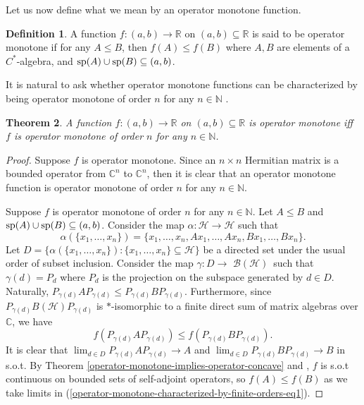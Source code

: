 \documentclass[12pt,a4paper]{amsart}
\newtheorem{theorem}{Theorem}
\theoremstyle{definition}
\newtheorem{definition}[theorem]{Definition}
\newcommand{\mybh}{$\mathscr{B}(\mathscr{H})$}
\begin{document}
	Let us now define what we mean by an operator monotone function.
	\begin{definition}
		 A function $f: (a, b) \rightarrow \mathbb{R}$ on $(a, b) \subseteq \mathbb{R}$ is said to be operator monotone if for any $A \leq B$, then $f(A) \leq f(B)$ 	where $A, B$ are elements of a $C^{*}$-algebra, and $\textnormal{sp}(A) \cup \textnormal{sp}(B) \subseteq (a,b)$.
	\end{definition}
	It is natural to ask whether operator monotone functions can be characterized by being operator monotone of order $n$ for any $n \in \mathbb{N}$ \cite[Theorem 2.5]{bendat}.
	
	\begin{theorem}\label{operator-monotone-characterized-by-finite-orders}
		A function $ f: (a,b) \rightarrow \mathbb{R} $ on $(a, b) \subseteq \mathbb{R}$ is operator monotone iff  $f$ is operator monotone of order $n$ for any $n \in \mathbb{N}$.
	\end{theorem}
	\begin{proof}
		Suppose $f$ is operator monotone. Since an $n \times n$ Hermitian matrix is a bounded operator from $\mathbb{C}^{n}$ to $\mathbb{C}^{n}$, then it is clear that an operator monotone function is operator monotone of order $n$ for any $n \in \mathbb{N}$. 
		\par
		Suppose $f$ is operator monotone of order $n$ for any $n \in \mathbb{N}$. Let $A \leq B$ and $\textnormal{sp}(A) \cup \textnormal{sp}(B) \subseteq (a,b)$.  Consider the map $\alpha: \mathscr{H} \rightarrow \mathscr{H}$ such that
		\[  \alpha(\lbrace x_1, \ldots, x_n \rbrace) = \lbrace x_1, \ldots, x_n, Ax_1, \ldots, Ax_n, Bx_1, \ldots, Bx_n \rbrace. \]
		Let $D = \lbrace \alpha(\lbrace x_1, \ldots, x_n \rbrace): \lbrace x_1, \ldots, x_n \rbrace \subseteq \mathscr{H} \rbrace$ be a directed set under the usual order of subset inclusion. Consider the map $\gamma: D \rightarrow $ \mybh\, such that $\gamma(d) = P_d$ where $P_d$ is the projection on the subspace generated by $d \in D$.
		Naturally, $P_{\gamma(d)} A P_{\gamma(d)} \leq P_{\gamma(d)} B P_{\gamma(d)} $. Furthermore, since $P_{\gamma(d)}  B(\mathscr{H}) P_{{\gamma(d)} }$ is $\ast$-isomorphic to a finite direct sum of matrix algebras over $\mathbb{C}$, we have
		\begin{equation}\label{operator-monotone-characterized-by-finite-orders-eq1}
			f (P_{\gamma(d)} A P_{\gamma(d)}) \leq  f (P_{\gamma(d)} B P_{\gamma(d)}).
		\end{equation}
		It is clear that $ \displaystyle{\lim_{d \in D} P_{\gamma(d)} A P_{\gamma(d)} \rightarrow A}$ and $ \displaystyle{\lim_{d \in D} P_{\gamma(d)} B P_{\gamma(d)} \rightarrow B}$ in s.o.t.
		By Theorem \ref{operator-monotone-implies-operator-concave} and \cite[Proposition 5.3.2]{kadison-vol-1}, $f $ is s.o.t continuous on bounded sets of self-adjoint operators, so $f(A) \leq f(B)$ as we take limits in (\ref{operator-monotone-characterized-by-finite-orders-eq1}).
	\end{proof}
	
\end{document}
